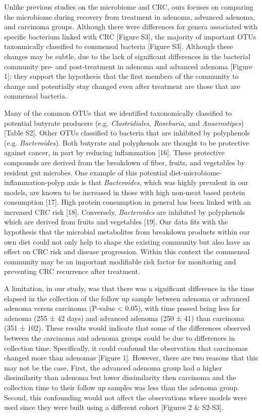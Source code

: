 \documentclass[12pt,]{article}
\begin{document}
Unlike previous studies on the microbiome and CRC, ours focuses on
comparing the microbiome during recovery from treatment in adenoma,
advanced adenoma, and carcinoma groups. Although there were differences
for genera associated with specific bacterium linked with CRC {[}Figure
S3{]}, the majority of important OTUs taxonmically classified to
commensal bacteria {[}Figure S3{]}. Although these changes may be
subtle, due to the lack of significant differences in the bacterial
community pre- and post-treatment in adenoma and advanced adenoma
{[}Figure 1{]}; they support the hypothesis that the first members of
the community to change and potentially stay changed even after
treatment are those that are commensal bacteria.

Many of the common OTUs that we identified taxonomically classified to
potential butyrate producers (e.g. \emph{Clostridiales},
\emph{Roseburia}, and \emph{Anaerostipes}) {[}Table S2{]}. Other OTUs
classified to bacteria that are inhibited by polyphenols (e.g.
\emph{Bacteroides}). Both butyrate and polyphenols are thought to be
protective against cancer, in part by reducing inflammation {[}16{]}.
These protective compounds are derived from the breakdown of fiber,
fruits, and vegetables by resident gut microbes. One example of this
potential diet-microbiome-inflammation-polyp axis is that
\emph{Bacteroides}, which was highly prevalent in our models, are known
to be increased in those with high non-meat based protein consumption
{[}17{]}. High protein consumption in general has been linked with an
increased CRC risk {[}18{]}. Conversely, \emph{Bacteroides} are
inhibited by polyphenols which are derived from fruits and vegetables
{[}19{]}. Our data fits with the hypothesis that the microbial
metabolites from breakdown products within our own diet could not only
help to shape the existing community but also have an effect on CRC risk
and disease progression. Within this context the commensal community may
be an important modifiable risk factor for monitoring and preventing CRC
recurrence after treatment.

A limitation, in our study, was that there was a significant difference
in the time elapsed in the collection of the follow up sample between
adenoma or advanced adenoma versus carcinoma (P-value \textless{} 0.05),
with time passed being less for adenoma (255 ± 42 days) and advanced
adenoma (250 ± 41) than carcinoma (351 ± 102). These results would
indicate that some of the differences observed between the carcinoma and
adenoma groups could be due to differences in collection time.
Specifically, it could confound the observation that carcinomas changed
more than adenomas {[}Figure 1{]}. However, there are two reasons that
this may not be the case. First, the advanced adenoma group had a higher
dissimilarity than adenoma but lower dissimilarity then carcinoma and
the collection time to their follow up samples was less than the adenoma
group. Second, this confounding would not affect the observations where
models were used since they were built using a different cohort
{[}Figures 2 \& S2-S3{]}.
\end{document}
